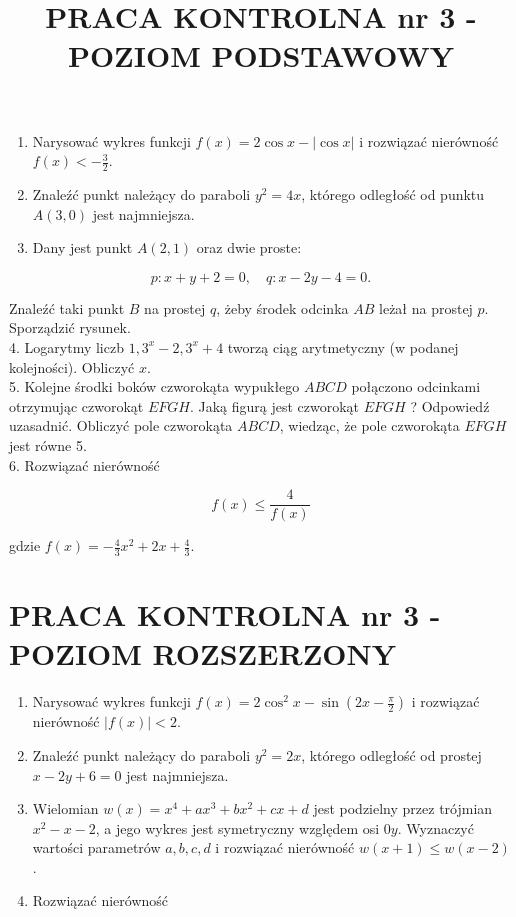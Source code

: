 \documentclass[10pt]{article}
\title{PRACA KONTROLNA nr 3 - POZIOM PODSTAWOWY }
\author{}
\date{}
\begin{document}
\maketitle
\begin{enumerate}
  \item Narysować wykres funkcji $f(x)=2 \cos x-|\cos x|$ i rozwiązać nierówność $f(x)<-\frac{3}{2}$.
  \item Znaleźć punkt należący do paraboli $y^{2}=4 x$, którego odległość od punktu $A(3,0)$ jest najmniejsza.
  \item Dany jest punkt $A(2,1)$ oraz dwie proste:
\end{enumerate}

$$
p: x+y+2=0, \quad q: x-2 y-4=0 .
$$

Znaleźć taki punkt $B$ na prostej $q$, żeby środek odcinka $A B$ leżał na prostej $p$. Sporządzić rysunek.\\
4. Logarytmy liczb $1,3^{x}-2,3^{x}+4$ tworzą ciąg arytmetyczny (w podanej kolejności). Obliczyć $x$.\\
5. Kolejne środki boków czworokąta wypukłego $A B C D$ połączono odcinkami otrzymując czworokąt $E F G H$. Jaką figurą jest czworokąt $E F G H$ ? Odpowiedź uzasadnić. Obliczyć pole czworokąta $A B C D$, wiedząc, że pole czworokąta $E F G H$ jest równe 5.\\
6. Rozwiązać nierówność

$$
f(x) \leqslant \frac{4}{f(x)}
$$

gdzie $f(x)=-\frac{4}{3} x^{2}+2 x+\frac{4}{3}$.

\section*{PRACA KONTROLNA nr 3 - POZIOM ROZSZERZONY}
\begin{enumerate}
  \item Narysować wykres funkcji $f(x)=2 \cos ^{2} x-\sin \left(2 x-\frac{\pi}{2}\right)$ i rozwiązać nierówność $|f(x)|<2$.
  \item Znaleźć punkt należący do paraboli $y^{2}=2 x$, którego odległość od prostej $x-2 y+6=0$ jest najmniejsza.
  \item Wielomian $w(x)=x^{4}+a x^{3}+b x^{2}+c x+d$ jest podzielny przez trójmian $x^{2}-x-2$, a jego wykres jest symetryczny względem osi $0 y$. Wyznaczyć wartości parametrów $a, b, c, d$ i rozwiązać nierówność $w(x+1) \leqslant w(x-2)$.
  \item Rozwiązać nierówność
\end{enumerate}
\end{document}
